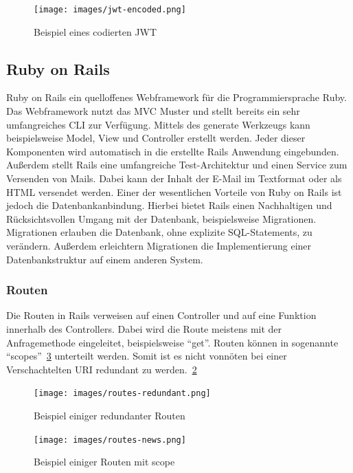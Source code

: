 \documentclass[11pt]{article}
\begin{document}
	\begin{figure}[h]
		\texttt{[image: images/jwt-encoded.png]}
		\caption{Beispiel eines codierten \gls{JWT} }
		\label{fig:jwt-encoded}
	\end{figure}
	
	\subsection{Ruby on Rails}
	\label{sec: rails}
	Ruby on Rails ein quelloffenes Webframework für die Programmiersprache Ruby. Das Webframework nutzt das \gls{MVC} Muster und stellt bereits ein sehr umfangreiches \gls{CLI} zur Verfügung. Mittels des generate Werkzeugs kann beispielsweise Model, View und Controller erstellt werden. Jeder dieser Komponenten wird automatisch in die erstellte Rails Anwendung eingebunden. Außerdem stellt Rails eine umfangreiche Test-Architektur und einen Service zum Versenden von Mails. Dabei kann der Inhalt der E-Mail im Textformat oder als \gls{HTML} versendet werden. Einer der wesentlichen Vorteile von Ruby on Rails ist jedoch die Datenbankanbindung. Hierbei bietet Rails einen Nachhaltigen und Rücksichtsvollen Umgang mit der Datenbank, beispielsweise Migrationen. Migrationen erlauben die Datenbank, ohne explizite SQL-Statements, zu verändern. Außerdem erleichtern Migrationen die Implementierung einer Datenbankstruktur auf einem anderen System.
	
	
	\subsubsection{Routen}
	\label{sec: routen}
	Die Routen in Rails verweisen auf einen Controller und auf eine Funktion innerhalb des Controllers. Dabei wird die Route meistens mit der Anfragemethode eingeleitet, beispielsweise \enquote{get}. Routen können in sogenannte \enquote{scopes}~\ref{fig:routes-scope} unterteilt werden. Somit ist es nicht vonnöten bei einer Verschachtelten \gls{URI} redundant zu werden.~\ref{fig:routes-redundant}
	
	\begin{figure}
		\texttt{[image: images/routes-redundant.png]}
		\caption{Beispiel einiger redundanter Routen }
		\label{fig:routes-redundant}
	\end{figure}
	
	\begin{figure}
		\texttt{[image: images/routes-news.png]}
		\caption{Beispiel einiger Routen mit scope }
		\label{fig:routes-scope}
	\end{figure}
	
\end{document}
